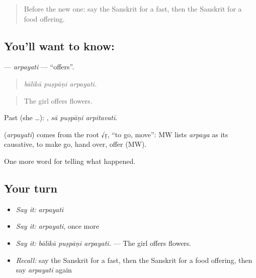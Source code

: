 \label{lesson:SA-C328-arpayati}



\begin{quote}
Before the new one: say the Sanskrit for a fast, then the Sanskrit for a food offering.
\end{quote}

\subsection*{You'll want to know: }
\textbf{} — \emph{arpayati} — \textquotedblleft{}offers\textquotedblright{}.

\begin{quote}
  
\end{quote}

\begin{quote}
\emph{bālikā puṣpāṇi arpayati.}
\end{quote}

\begin{quote}
The girl offers flowers.
\end{quote}

Past (she …):   , \emph{sā puṣpāṇi arpitavatī}.

\begin{cousinweb}
\textbf{} (\emph{arpayati}) comes from the root √ṛ, \textquotedblleft{}to go, move\textquotedblright{}: MW lists \emph{arpaya} as its causative, to make go, hand over, offer (MW).
\end{cousinweb}

\begin{grammarlens}[title={What you've built}]
One more word for telling what happened.
\end{grammarlens}

\subsection*{Your turn}
\begin{itemize}
\raggedright
  \item \emph{Say it:} \emph{arpayati}
  \item \emph{Say it:} \emph{arpayati}, once more
  \item \emph{Say it:} \emph{bālikā puṣpāṇi arpayati.} — The girl offers flowers.
  \item \emph{Recall:} say the Sanskrit for a fast, then the Sanskrit for a food offering, then say \emph{arpayati} again
\end{itemize}

